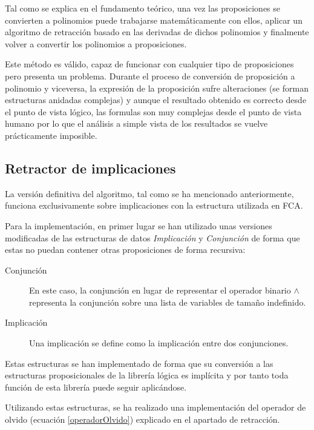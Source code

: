 	Tal como se explica en el fundamento teórico, una vez las proposiciones se convierten a polinomios puede trabajarse matemáticamente con ellos, aplicar un algoritmo de retracción basado en las derivadas de dichos polinomios y finalmente volver a convertir los polinomios a proposiciones.
	
	Este método es válido, capaz de funcionar con cualquier tipo de proposiciones pero presenta un problema. Durante el proceso de conversión de proposición a polinomio y viceversa, la expresión de la proposición sufre alteraciones (se forman estructuras anidadas complejas) y aunque el resultado obtenido es correcto desde el punto de vista lógico, las formulas son muy complejas desde el punto de vista humano por lo que el análisis a simple vista de los resultados se vuelve prácticamente imposible.
	
	
\subsection*{Retractor de implicaciones}
	
	La versión definitiva del algoritmo, tal como se ha mencionado anteriormente, funciona exclusivamente sobre implicaciones con la estructura utilizada en FCA.
	
	Para la implementación, en primer lugar se han utilizado unas versiones modificadas de las estructuras de datos \textit{Implicación} y \textit{Conjunción} de forma que estas no puedan contener otras proposiciones de forma recursiva:
	
	\begin{description}
		\item[Conjunción] En este caso, la conjunción en lugar de representar el operador binario $\wedge$ representa la conjunción sobre una lista de variables de tamaño indefinido.
		\item[Implicación] Una implicación se define como la implicación entre dos conjunciones.
	\end{description}

	Estas estructuras se han implementado de forma que su conversión a las estructuras proposicionales de la librería lógica es implícita y por tanto toda función de esta librería puede seguir aplicándose.
	
	Utilizando estas estructuras, se ha realizado una implementación del operador de olvido (ecuación \ref{operadorOlvido}) explicado en el apartado de retracción.
	
